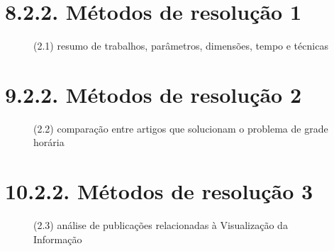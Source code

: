 

\cite{Miranda2012}

\cite{Miranda2012}

\cite{Poulsen2012}

\cite{Arratia2021}

\cite{Alencar2019}

\chapter*{8.2.2. Métodos de resolução 1} %

\begin{figure}[htpb]\caption{(2.1) resumo de trabalhos, parâmetros, dimensões, tempo e técnicas} \end{figure}

\chapter*{9.2.2. Métodos de resolução 2} %

\begin{figure}[htpb]\caption{(2.2) comparação entre artigos que solucionam o problema de grade horária} \end{figure}

\chapter*{10.2.2. Métodos de resolução 3} %

\begin{figure}[htpb]\caption{(2.3) análise de publicações relacionadas à Visualização da Informação} \end{figure}




